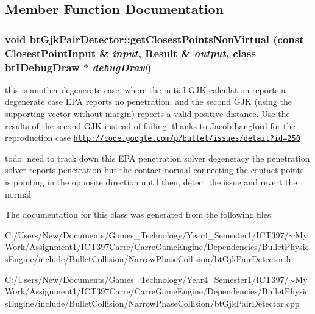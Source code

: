\subsection{Member Function Documentation}
\hypertarget{classbt_gjk_pair_detector_bc29953dd7aee59e9ca887963c26c8c2}{
\subsubsection[getClosestPointsNonVirtual]{\setlength{\rightskip}{0pt plus 5cm}void btGjkPairDetector::getClosestPointsNonVirtual (const ClosestPointInput \& {\em input}, \/  Result \& {\em output}, \/  class {\bf btIDebugDraw} $\ast$ {\em debugDraw})}}
\label{classbt_gjk_pair_detector_bc29953dd7aee59e9ca887963c26c8c2}




this is another degenerate case, where the initial GJK calculation reports a degenerate case EPA reports no penetration, and the second GJK (using the supporting vector without margin) reports a valid positive distance. Use the results of the second GJK instead of failing. thanks to Jacob.Langford for the reproduction case \href{http://code.google.com/p/bullet/issues/detail?id=250}{\tt http://code.google.com/p/bullet/issues/detail?id=250}

todo: need to track down this EPA penetration solver degeneracy the penetration solver reports penetration but the contact normal connecting the contact points is pointing in the opposite direction until then, detect the issue and revert the normal 

The documentation for this class was generated from the following files:\begin{CompactItemize}
\item 
C:/Users/New/Documents/Games\_\-Technology/Year4\_\-Semester1/ICT397/$\sim$My Work/Assignment1/ICT397Carre/CarreGameEngine/Dependencies/BulletPhysicsEngine/include/BulletCollision/NarrowPhaseCollision/btGjkPairDetector.h\item 
C:/Users/New/Documents/Games\_\-Technology/Year4\_\-Semester1/ICT397/$\sim$My Work/Assignment1/ICT397Carre/CarreGameEngine/Dependencies/BulletPhysicsEngine/include/BulletCollision/NarrowPhaseCollision/btGjkPairDetector.cpp\end{CompactItemize}
